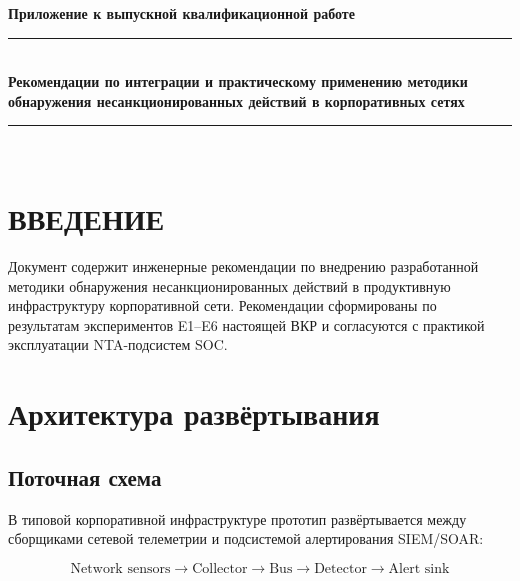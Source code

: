 \documentclass[14pt, a4paper]{extarticle}
\begin{document}
\begin{titlepage}
\centering
\vspace*{1cm}
{\large\bfseries Приложение к выпускной квалификационной работе}\\[0.5cm]
\rule{\linewidth}{0.4pt}\\[0.5cm]
{\Large\bfseries Рекомендации по интеграции и практическому применению
методики обнаружения несанкционированных действий в корпоративных
сетях}\\[0.5cm]
\rule{\linewidth}{0.4pt}\\[2cm]

\vfill
{\large \the\year}
\end{titlepage}

\tableofcontents
\newpage

\section*{ВВЕДЕНИЕ}

Документ содержит инженерные рекомендации по внедрению разработанной
методики обнаружения несанкционированных действий в продуктивную
инфраструктуру корпоративной сети. Рекомендации сформированы по
результатам экспериментов E1--E6 настоящей ВКР и согласуются с практикой
эксплуатации NTA-подсистем SOC.

\section{Архитектура развёртывания}

\subsection{Поточная схема}

В типовой корпоративной инфраструктуре прототип развёртывается между
сборщиками сетевой телеметрии и подсистемой алертирования SIEM/SOAR:

\begin{equation*}
\boxed{\text{Network sensors} \to \text{Collector} \to \text{Bus}
\to \text{Detector} \to \text{Alert sink}}
\end{equation*}
\end{document}
